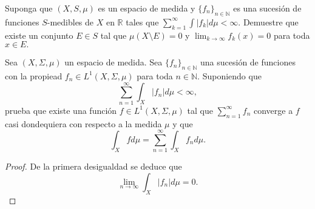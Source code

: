 \documentclass[12pt]{article}
\newcommand{\N}{\mathbb{N}}
\newcommand{\R}{\mathbb{R}}
\newenvironment{problem}[2][Problema]{\begin{trivlist}
\item[\hskip \labelsep {\bfseries #1}\hskip \labelsep {\bfseries #2.}]}{\end{trivlist}}
\begin{document}
\begin{problem}{13} Suponga que $(X, S, \mu)$ es un espacio de medida y $\{f_n\}_{n\in \N}$ es una sucesión de funciones $S$-medibles de $X$ en $\R$ tales que $\sum_{k=1}^\infty \int \lvert f_k \rvert d \mu < \infty$. Demuestre que existe un conjunto $E \in S$ tal que $\mu(X \setminus E) = 0$ y $\lim_{k \to \infty} f_k(x) = 0$ para toda $x \in E.$ 
\end{problem}

\begin{problem}{14} Sea $(X, \Sigma, \mu)$ un espacio de medida. Sea $\{f_n\}_{n \in \N}$ una sucesión de funciones con la propiead $f_n \in L^1(X, \Sigma, \mu)$ para toda $n \in \N$. Suponiendo que
$$\sum_{n=1}^\infty \int_{X} \lvert f_n \rvert d \mu < \infty,$$
prueba que existe una función $f \in L^1(X, \Sigma, \mu)$ tal que $\sum_{n=1}^\infty f_n$
converge a $f$ casi dondequiera con respecto a la medida $\mu$ y que 
$$\int_X f d \mu = \sum_{n=1}^\infty \int_X f_n d \mu.$$
\end{problem}
\begin{proof}
    De la primera desigualdad se deduce que 
    $$\lim_{n \to \infty} \int_X \lvert f_n \rvert d \mu  = 0.$$
\end{proof}
\end{document}
